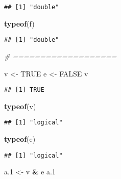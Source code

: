 \documentclass[
]{article}
\newenvironment{Shaded}{\begin{snugshade}}{\end{snugshade}}
\newcommand{\CommentTok}[1]{\textcolor[rgb]{0.56,0.35,0.01}{\textit{#1}}}
\newcommand{\ConstantTok}[1]{\textcolor[rgb]{0.56,0.35,0.01}{#1}}
\newcommand{\FloatTok}[1]{\textcolor[rgb]{0.00,0.00,0.81}{#1}}
\newcommand{\FunctionTok}[1]{\textcolor[rgb]{0.13,0.29,0.53}{\textbf{#1}}}
\newcommand{\NormalTok}[1]{#1}
\newcommand{\OtherTok}[1]{\textcolor[rgb]{0.56,0.35,0.01}{#1}}
\newcommand{\SpecialCharTok}[1]{\textcolor[rgb]{0.81,0.36,0.00}{\textbf{#1}}}
\begin{document}
\begin{verbatim}
## [1] "double"
\end{verbatim}

\begin{Shaded}
\begin{Highlighting}[]
\FunctionTok{typeof}\NormalTok{(f)}
\end{Highlighting}
\end{Shaded}

\begin{verbatim}
## [1] "double"
\end{verbatim}

\begin{Shaded}
\begin{Highlighting}[]
\CommentTok{\# =================== }

\NormalTok{v }\OtherTok{\textless{}{-}} \ConstantTok{TRUE} 
\NormalTok{e }\OtherTok{\textless{}{-}} \ConstantTok{FALSE} 
\NormalTok{v}
\end{Highlighting}
\end{Shaded}

\begin{verbatim}
## [1] TRUE
\end{verbatim}

\begin{Shaded}
\begin{Highlighting}[]
\FunctionTok{typeof}\NormalTok{(v)}
\end{Highlighting}
\end{Shaded}

\begin{verbatim}
## [1] "logical"
\end{verbatim}

\begin{Shaded}
\begin{Highlighting}[]
\FunctionTok{typeof}\NormalTok{(e)}
\end{Highlighting}
\end{Shaded}

\begin{verbatim}
## [1] "logical"
\end{verbatim}

\begin{Shaded}
\begin{Highlighting}[]
\NormalTok{a}\FloatTok{.1} \OtherTok{\textless{}{-}}\NormalTok{ v }\SpecialCharTok{\&}\NormalTok{ e }
\NormalTok{a}\FloatTok{.1}
\end{Highlighting}
\end{Shaded}
\end{document}
